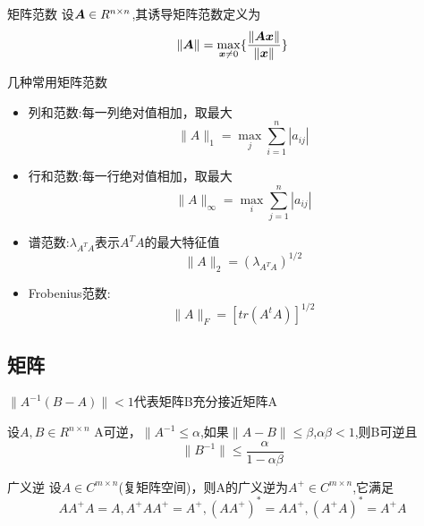 \documentclass{article}
\begin{document}
\begin{definition}{矩阵范数}
设${\boldsymbol A} \in R^{n \times n}$,其诱导矩阵范数定义为
$$
\|{\boldsymbol A}\| = \max_{{\boldsymbol x} \neq 0}\{ \frac{\| {\boldsymbol A} {\boldsymbol x} \| }{\|{\boldsymbol x}\|} \}
$$
\end{definition}
几种常用矩阵范数
\begin{itemize}
\item 列和范数:每一列绝对值相加，取最大
	$$
	\|A\|_1=\max_j \sum^n_{i=1}|a_{ij}|
	$$
\item 行和范数:每一行绝对值相加，取最大
	$$
	\|A\|_{\infty}=\max_i \sum^n_{j=1}|a_{ij}|
	$$
\item 谱范数:$\lambda_{A^T A}$表示$A^T A$的最大特征值
	$$
	\|A\|_{2}=(\lambda_{A^T A})^{1/2}
	$$
\item Frobenius范数:
	$$
	\|A\|_{F}=[tr(A^t A)]^{1/2}
	$$
\end{itemize}

\subsection{矩阵}
$\|A^{-1}(B-A)\| < 1$代表矩阵B充分接近矩阵A
\begin{theorem}

设$A,B \in R^{n \times n}$ A可逆，$\|A^{-1} \leq \alpha$,如果$\|A-B\| \leq \beta$,$\alpha \beta < 1$,则B可逆且
$$
\|B^{-1}\| \leq \frac{\alpha}{1-\alpha \beta}
$$
\end{theorem}

\begin{definition}{广义逆}
设$A \in C^{m \times n}$(复矩阵空间)，则A的广义逆为$A^{+} \in C^{m \times n}$,它满足
$$
AA^{+}A = A, A^{+}AA^{+} = A^{+}, (AA^+)^*=AA^+, (A^+A)^*=A^+A
$$
\end{definition}
\end{document}
